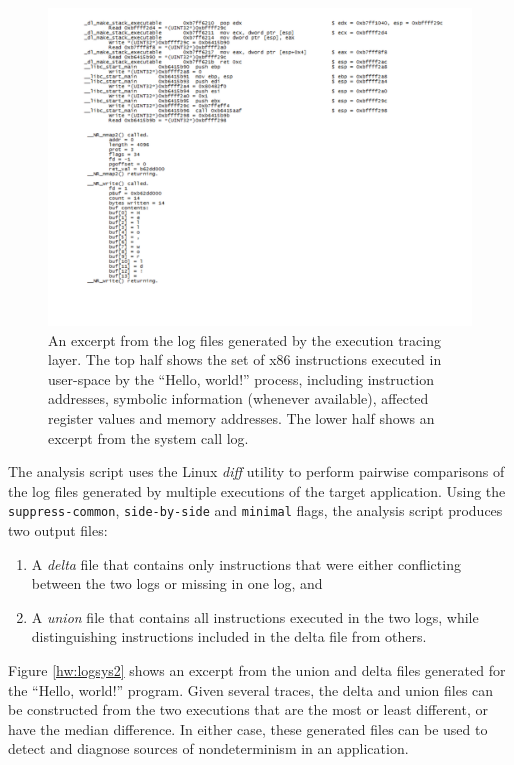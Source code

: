 \begin{figure}[h]
  \center
  \includegraphics[scale=0.50, trim=2cm 2cm 2cm 0.5cm]{log.pdf}
  \caption[An excerpt from the log files generated by the execution tracing layer]%
          {An excerpt from the log files generated by the execution tracing layer.
          The top half shows the set of x86 instructions executed 
          in user-space by the ``Hello, world!'' process, including instruction addresses, 
          symbolic information (whenever available), affected register values and memory 
          addresses. The lower half shows an excerpt from the system call log.}
  \label{hw:logsys}
\end{figure}
\newpage
{} \newline
The analysis script uses the Linux \emph{diff} utility
to perform pairwise comparisons of the log files generated 
by multiple executions of the target application. 
Using the \texttt{suppress-common}, \texttt{side-by-side}
and \texttt{minimal} flags, the analysis script
produces two output files: 
\begin{enumerate}
\item A {\em delta} file
that contains only instructions that were 
either conflicting between the two logs or missing in one log, and
\item A {\em union} file that contains all instructions
executed in the two logs, while distinguishing instructions  
included in the delta file from others.
\end{enumerate}
Figure \ref{hw:logsys2} shows an excerpt from the 
union and delta files generated for the ``Hello, world!''
program. Given several traces, the delta and union
files can be constructed from the two
executions that are the most or least different, 
or have the median difference. In either case, these generated files can be used to
detect and diagnose sources of nondeterminism
in an application. 

